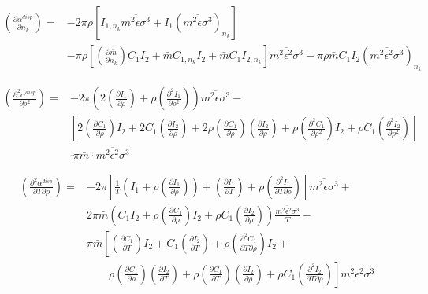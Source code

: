 \documentclass[internal,english]{sintefmemo2012}
\newcommand*{\pder}[2]{\left(\frac{\partial #1}{\partial #2}\right)}
\newcommand*{\pdder}[2]{\left(\frac{\partial^2 #1}{\partial #2^2}\right)}
\newcommand*{\pdcross}[3]{\left(\frac{\partial^2 #1}{\partial #2 \partial #3}\right)}
\newcommand{\lp}{\left(}
\newcommand{\rp}{\right)}
\begin{document}
\begin{equation}
  \begin{aligned}
    \pder{\alpha^{disp}}{n_k} =& -2 \pi \rho \left[ I_{1,n_k} \overline{m^2 \epsilon \sigma^3} + I_1 (\overline{m^2 \epsilon \sigma^3})_{n_k} \right] \\
    &- \pi \rho \left[ \pder{\bar m}{n_k} C_1 I_2 + \bar m C_{1,n_k} I_2 + \bar m C_1 I_{2,n_k} \right] \overline{m^2 \epsilon^2 \sigma^3} - \pi \rho \bar m C_1 I_2 (\overline{m^2 \epsilon^2 \sigma^3})_{n_k}
  \end{aligned}
\end{equation}

\begin{equation}
  \begin{aligned}
    \pdder{\alpha^{disp}}{\rho} =& -2 \pi \lp 2 \pder{I_1}{\rho} + \rho \pdder{I_1}{\rho} \rp \overline{m^2 \epsilon \sigma^3} - \\
    & \left[ 2 \pder{C_1}{\rho} I_2 + 2 C_1 \pder{I_2}{\rho} + 2 \rho \pder{C_1}{\rho} \pder{I_2}{\rho} + \rho \pdder{C_1}{\rho} I_2 + \rho C_1 \pdder{I_2}{\rho} \right]  \\
    &\cdot \pi \bar m \cdot \overline{m^2 \epsilon^2 \sigma^3}
  \end{aligned}
\end{equation}

\begin{equation}
  \begin{aligned}
    \pdcross{\alpha^{disp}}{T}{\rho} =& -2 \pi \left[ \frac{1}{T}\lp I_1 + \rho \pder{I_1}{\rho} \rp + \pder{I_1}{T} + \rho \pdcross{I_1}{T}{\rho} \right] \overline{m^2 \epsilon \sigma^3} + \\
    & 2 \pi \bar m \lp C_1 I_2 + \rho \pder{C_1}{\rho} I_2 + \rho C_1 \pder{I_2}{\rho} \rp \frac{\overline{m^2 \epsilon^2 \sigma^3}}{T} - \\
    &  \pi \bar m \left[ \pder{C_1}{T} I_2 + C_1 \pder{I_2}{T} + \rho \pdcross{C_1}{T}{\rho} I_2 + \right. \\
    & \qquad \left. \rho \pder{C_1}{\rho} \pder{I_2}{T} + \rho \pder{C_1}{T} \pder{I_2}{\rho} + \rho C_1 \pdcross{I_2}{T}{\rho} \right] \overline{m^2 \epsilon^2 \sigma^3}
  \end{aligned}  
\end{equation}
\end{document}
